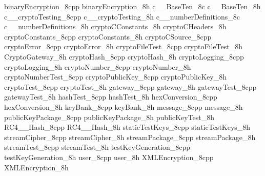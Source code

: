 		{binaryEncryption_8cpp}
		{binaryEncryption_8h}
		{c__BaseTen_8c}
		{c__BaseTen_8h}
		{c__cryptoTesting_8cpp}
		{c__cryptoTesting_8h}
		{c__numberDefinitions_8c}
		{c__numberDefinitions_8h}
		{cryptoCConstants_8h}
		{cryptoCHeaders_8h}
		{cryptoConstants_8cpp}
		{cryptoConstants_8h}
		{cryptoCSource_8cpp}
		{cryptoError_8cpp}
		{cryptoError_8h}
		{cryptoFileTest_8cpp}
		{cryptoFileTest_8h}
		{CryptoGateway_8h}
		{cryptoHash_8cpp}
		{cryptoHash_8h}
		{cryptoLogging_8cpp}
		{cryptoLogging_8h}
		{cryptoNumber_8cpp}
		{cryptoNumber_8h}
		{cryptoNumberTest_8cpp}
		{cryptoPublicKey_8cpp}
		{cryptoPublicKey_8h}
		{cryptoTest_8cpp}
		{cryptoTest_8h}
		{gateway_8cpp}
		{gateway_8h}
		{gatewayTest_8cpp}
		{gatewayTest_8h}
		{hashTest_8cpp}
		{hashTest_8h}
		{hexConversion_8cpp}
		{hexConversion_8h}
		{keyBank_8cpp}
		{keyBank_8h}
		{message_8cpp}
		{message_8h}
		{publicKeyPackage_8cpp}
		{publicKeyPackage_8h}
		{publicKeyTest_8h}
		{RC4__Hash_8cpp}
		{RC4__Hash_8h}
		{staticTestKeys_8cpp}
		{staticTestKeys_8h}
		{streamCipher_8cpp}
		{streamCipher_8h}
		{streamPackage_8cpp}
		{streamPackage_8h}
		{streamTest_8cpp}
		{streamTest_8h}
		{testKeyGeneration_8cpp}
		{testKeyGeneration_8h}
		{user_8cpp}
		{user_8h}
		{XMLEncryption_8cpp}
		{XMLEncryption_8h}
